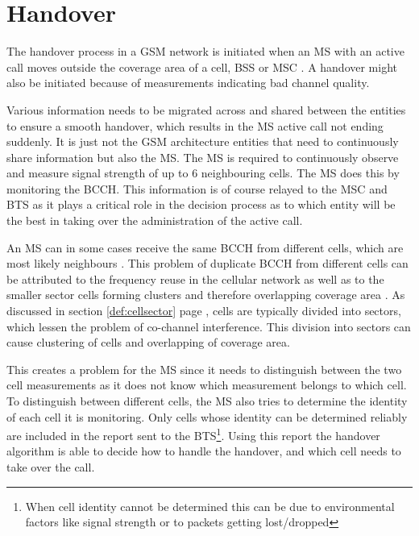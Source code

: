 \section{Handover}
\label{sec:handover}
The handover process in a GSM network is initiated when an MS with an active call moves outside the coverage area of a cell, BSS or MSC \cite{GSMArchitectureProtocolsServices,wirelesstelcoMullet,Eisenblatter}. A handover might also be initiated because of measurements indicating bad channel quality\cite{GSMArchitectureProtocolsServices}. 

Various information needs to be migrated across and shared between the entities to ensure a smooth handover, which results in the MS active call not ending suddenly. It is just not the GSM architecture entities that need to continuously share information but also the MS. The MS is required to continuously observe and measure signal strength of up to 6 neighbouring cells. The MS does this by monitoring the BCCH\cite{GSMArchitectureProtocolsServices,wirelesstelcoMullet}. This information is of course relayed to the MSC and BTS as it plays a critical role in the decision process as to which entity will be the best in taking over the administration of the active call\cite{GSMArchitectureProtocolsServices,wirelesstelcoMullet}.

An MS can in some cases receive the same BCCH from different cells, which are most likely neighbours \cite{GSMArchitectureProtocolsServices}. This problem of duplicate BCCH from different cells can be attributed to the frequency reuse in the cellular network as well as to the smaller sector cells forming clusters and therefore overlapping coverage area \cite{GSMArchitectureProtocolsServices}. As discussed in section \ref{def:cellsector} page \pageref{def:cellsector}, cells are typically divided into sectors, which lessen the problem of co-channel interference. This division into sectors can cause clustering of cells and overlapping of coverage area.

This creates a problem for the MS since it needs to distinguish between the two cell measurements as it does not know which measurement belongs to which cell\cite{GSMArchitectureProtocolsServices}. To distinguish between different cells, the MS also tries to determine the identity of each cell it is monitoring. Only cells whose identity can be determined reliably are included in the report sent to the BTS\cite{Eisenblatter,GSMArchitectureProtocolsServices,wirelesstelcoMullet}\footnote{When cell identity cannot be determined this can be due to environmental factors like signal strength or to packets getting lost/dropped}. Using this report the handover algorithm is able to decide how to handle the handover, and which cell needs to take over the call\cite{Eisenblatter,GSMArchitectureProtocolsServices,wirelesstelcoMullet}.

